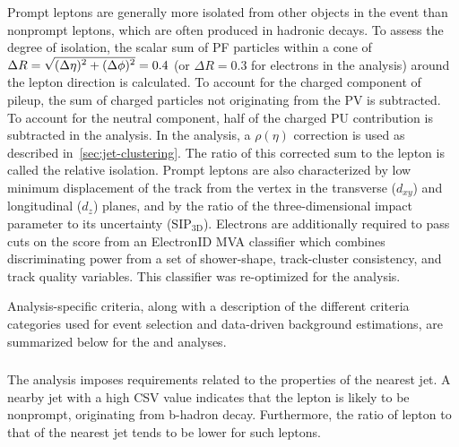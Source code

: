 Prompt leptons are generally more isolated from other objects in the event than
nonprompt leptons, which are often produced in hadronic decays. To assess the
degree of isolation, the scalar sum of PF particles within a cone of $\Delta R =
\sqrt{\smash[b]{(\Delta \eta)^2 + (\Delta \phi)^2}} = 0.4$ (or $\Delta R = 0.3$
for electrons in the \thirteenTeV analysis) around the lepton direction is
calculated. To account for the charged component of pileup, the sum \pT of
charged particles not originating from the PV is subtracted. To account for the
neutral component, half of the charged PU contribution is subtracted in the
\eightTeV analysis. In the \thirteenTeV analysis, a $\rho(\eta)$ correction is
used as described in~\cref{sec:jet-clustering}. The ratio of this corrected sum
to the lepton \pT is called the relative isolation. Prompt leptons are also
characterized by low minimum displacement of the track from the vertex in the
transverse ($d_{xy}$) and longitudinal ($d_z$) planes, and by the ratio of the
three-dimensional impact parameter to its uncertainty ($\text{SIP}_\text{3D}$).
Electrons are additionally required to pass cuts on the score from an ElectronID
MVA classifier which combines discriminating power from a set of shower-shape,
track-cluster consistency, and track quality variables. This classifier was
re-optimized for the \thirteenTeV analysis.

Analysis-specific criteria, along with a description of the different criteria
categories used for event selection and data-driven background estimations, are
summarized below for the \eightTeV and \thirteenTeV analyses.

\subsubsection{\eightTeV}
The \eightTeV analysis imposes requirements related to the properties of the
nearest jet. A nearby jet with a high CSV value indicates that the lepton is
likely to be nonprompt, originating from b-hadron decay. Furthermore, the ratio
of lepton \pT to that of the nearest jet tends to be lower for such leptons.

